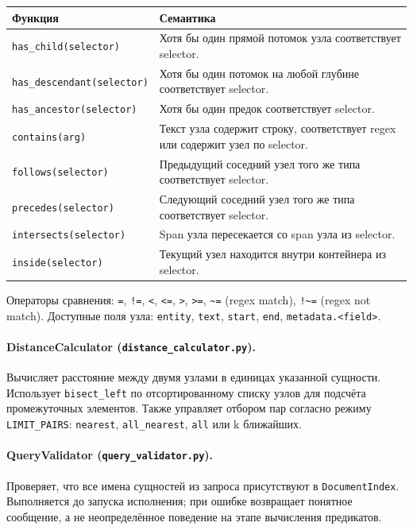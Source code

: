 \documentclass[a4paper,12pt]{article}
\begin{document}
\begin{table}[h!]
\centering
\small
\begin{tabularx}{\textwidth}{lX}
\toprule
\textbf{Функция}                   & \textbf{Семантика} \\
\midrule
\texttt{has\_child(selector)}      & Хотя бы один прямой потомок узла соответствует selector. \\
\texttt{has\_descendant(selector)} & Хотя бы один потомок на любой глубине соответствует selector. \\
\texttt{has\_ancestor(selector)}   & Хотя бы один предок соответствует selector. \\
\texttt{contains(arg)}             & Текст узла содержит строку, соответствует regex или содержит узел по selector. \\
\texttt{follows(selector)}         & Предыдущий соседний узел того же типа соответствует selector. \\
\texttt{precedes(selector)}        & Следующий соседний узел того же типа соответствует selector. \\
\texttt{intersects(selector)}      & Span узла пересекается со span узла из selector. \\
\texttt{inside(selector)}          & Текущий узел находится внутри контейнера из selector. \\
\bottomrule
\end{tabularx}
\end{table}

Операторы сравнения: \texttt{=}, \texttt{!=}, \texttt{<}, \texttt{<=}, \texttt{>}, \texttt{>=}, \texttt{\textasciitilde=} (regex match), \texttt{!\textasciitilde=} (regex not match). Доступные поля узла: \texttt{entity}, \texttt{text}, \texttt{start}, \texttt{end}, \texttt{metadata.<field>}.

\paragraph{DistanceCalculator (\texttt{distance\_calculator.py}).}
Вычисляет расстояние между двумя узлами в единицах указанной сущности. Использует \texttt{bisect\_left} по отсортированному списку узлов для подсчёта промежуточных элементов. Также управляет отбором пар согласно режиму \texttt{LIMIT\_PAIRS}: \texttt{nearest}, \texttt{all\_nearest}, \texttt{all} или k ближайших.

\paragraph{QueryValidator (\texttt{query\_validator.py}).}
Проверяет, что все имена сущностей из запроса присутствуют в \texttt{DocumentIndex}. Выполняется до запуска исполнения; при ошибке возвращает понятное сообщение, а не неопределённое поведение на этапе вычисления предикатов.
\end{document}
